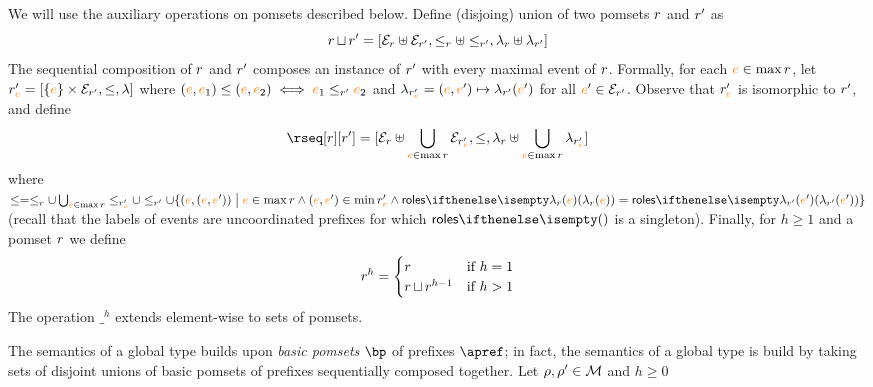 %
We will use the auxiliary operations on pomsets described below.
%
Define (disjoing) union of two pomsets $r$ and $r'$ as
\[
  r \operatorname{\sqcup} r' =
  [\mathcal{E}_{r} \uplus \mathcal{E}_{r'},
  \leq_{r} \uplus \leq_{r'},
  \lambda_{r} \uplus \lambda_{r'}]
\]
The sequential composition of $r$ and $r'$ composes an
instance of $r'$ with every maximal event of $r$.
%
Formally, for each ${\color{orange}{e}} \in \max r$, let
$r'_{{\color{orange}{e}}} = [\{{\color{orange}{e}}\} \times \mathcal{E}_{r'}, \leq, \lambda]$ where
$({\color{orange}{e}},{\color{orange}{e}}_1) \leq ({\color{orange}{e}},{\color{orange}{e}}_2) \iff {\color{orange}{e}}_1 \leq_{r'} {\color{orange}{e}}_2$ and
$\lambda_{r'_{{\color{orange}{e}}}} = ({\color{orange}{e}},{\color{orange}{e}}') \mapsto \lambda_{r'}({\color{orange}{e}}')$ for
all ${\color{orange}{e}}' \in \mathcal{E}_{r'}$.
%
Observe that $r'_{{\color{orange}{e}}}$ is isomorphic to $r'$, and define
\[
  \rseq[\apom][\apom'] = 
  [\esetof{\apom} \uplus \bigcup_{\ae \in \max \apom}\esetof{\apom'_{\ae}},
  \leq,
  \alfof{\apom} \uplus \bigcup_{\ae \in \max \apom}\alfof{\apom'_{\ae}}]
\]
where
$\leq = \leqof{\apom} \cup \bigcup_{\ae \in \max
  \apom}\leqof{\apom'_{\ae}} \cup \leqof{\apom'} \cup
\{(\ae,(\ae,\ae')) \sst \ae \in \max \apom \land (\ae,\ae') \in \min
{\apom'_{\ae}} \land \roles{\alfof{\apom}(\ae)} =
\roles{\alfof{\apom'}(\ae')}\}$ (recall that the labels of events are
uncoordinated prefixes for which $\roles{}$ is a singleton).
%
%
Finally, for $h \geq 1$ and a pomset $r$ we define
\[
  r^h =
  \begin{cases}
    r & \text{if } h = 1
    \\
    r \operatorname{\sqcup} r^{h-1} & \text{if } h > 1
  \end{cases}
\]
The operation $\_^h$ extends element-wise to sets of pomsets.

The semantics of a global type builds upon \emph{basic pomsets} $\bp$
of prefixes $\apref$; in fact, the semantics of a global type is build
by taking sets of disjoint unions of basic pomsets of prefixes
sequentially composed together.
%
Let $\rho,\rho' \in \mathcal{M}$ and $h \geq 0$

